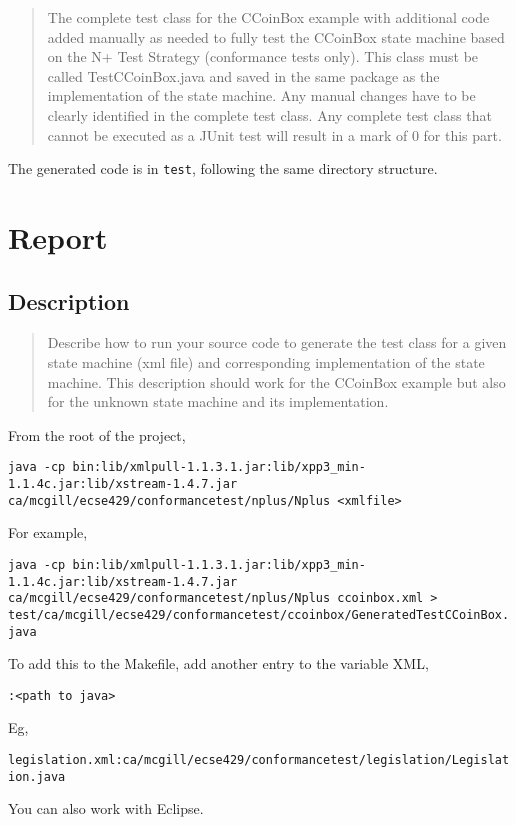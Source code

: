 \documentclass[ieee]{submit}
\begin{document}
\begin{quote}
The complete test class for the CCoinBox example with additional code added manually as
needed to fully test the CCoinBox state machine based on the N+ Test Strategy (conformance tests only). This class must be called TestCCoinBox.java and saved in the same package as the implementation of the state machine. Any manual changes have to be clearly identified in the
complete test class. Any complete test class that cannot be executed as a JUnit test will result in a mark of 0 for this part.
\end{quote}

The generated code is in {\tt test}, following the same directory structure.

\section{Report}

\subsection{Description}

\begin{quote}
Describe how to run your source code to generate the test class for a given state machine (xml file) and corresponding implementation of the state machine. This description should work for the CCoinBox example but also for the unknown state machine and its implementation.
\end{quote}

From the root of the project,

{\tt java -cp bin:lib/xmlpull-1.1.3.1.jar:lib/xpp3\_min-1.1.4c.jar:lib/xstream-1.4.7.jar ca/mcgill/ecse429/conformancetest/nplus/Nplus <xmlfile>}

For example,

{\tt java -cp bin:lib/xmlpull-1.1.3.1.jar:lib/xpp3\_min-1.1.4c.jar:lib/xstream-1.4.7.jar ca/mcgill/ecse429/conformancetest/nplus/Nplus ccoinbox.xml > test/ca/mcgill/ecse429/conformancetest/ccoinbox/GeneratedTestCCoinBox.java}

To add this to the Makefile, add another entry to the variable XML,

{\tt <xml file>:<path to java>}

Eg,

{\tt legislation.xml:ca/mcgill/ecse429/conformancetest/legislation/Legislation.java}

You can also work with Eclipse.
\end{document}
